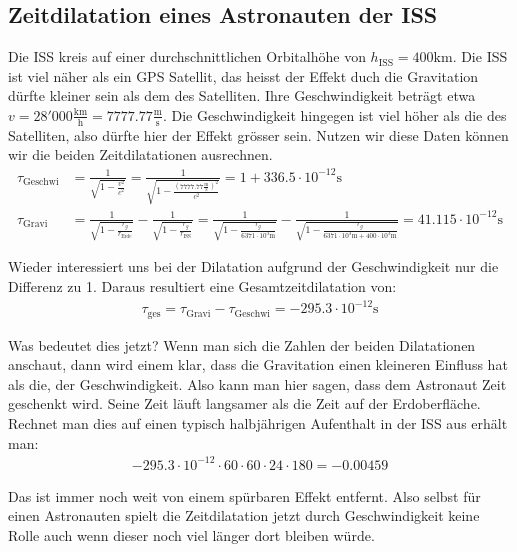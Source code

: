 \begin{refsection}
\subsection{Zeitdilatation eines Astronauten der ISS}
Die ISS kreis auf einer durchschnittlichen Orbitalhöhe von \( h_{\text{ISS}} = 400\text{km} \). Die ISS ist viel näher als ein GPS Satellit, das heisst der Effekt duch die Gravitation dürfte kleiner sein als dem des Satelliten. Ihre Geschwindigkeit beträgt etwa \( v = 28'000\frac{\text{km}}{\text{h}} = 7777.77\frac{\text{m}}{\text{s}} \). Die Geschwindigkeit hingegen ist viel höher als die des Satelliten, also dürfte hier der Effekt grösser sein. Nutzen wir diese Daten können wir die beiden Zeitdilatationen ausrechnen.
\begin{align*}
\tau_{\text{Geschwi}} &= \frac{1}{\sqrt{1 - \frac{v^2}{c^2}}} = \frac{1}{\sqrt{1 - \frac{( 7777.77\frac{\text{m}}{\text{s}})^2}{c^2}}} = 1 + 336.5 \cdot 10^{-12}\text{s}
\\
\tau_{\text{Gravi}} &= \frac{1}{\sqrt{1-\frac{r_g}{r_{\text{Erde}}}}} - \frac{1}{\sqrt{1-\frac{r_g}{r_{\text{ISS}}}}} 
= \frac{1}{\sqrt{1-\frac{r_g}{6371 \cdot 10^3\text{m}}}} - \frac{1}{\sqrt{1-\frac{r_g}{6371 \cdot 10^3\text{m} + 400 \cdot 10^3\text{m}}}} = 41.115 \cdot 10^{-12}\text{s}
\end{align*}

\noindent{}Wieder interessiert uns bei der Dilatation aufgrund der Geschwindigkeit nur die Differenz zu 1. Daraus resultiert eine Gesamtzeitdilatation von:
\begin{align*}
\tau_{\text{ges}} = \tau_{\text{Gravi}} - \tau_{\text{Geschwi}} = -295.3 \cdot 10^{-12}\text{s}
\end{align*}

\noindent{}Was bedeutet dies jetzt? Wenn man sich die Zahlen der beiden Dilatationen anschaut, dann wird einem klar, dass die Gravitation einen kleineren Einfluss hat als die, der Geschwindigkeit. Also kann man hier sagen, dass dem Astronaut Zeit geschenkt wird. Seine Zeit läuft langsamer als die Zeit auf der Erdoberfläche. Rechnet man dies auf einen typisch halbjährigen Aufenthalt in der ISS aus erhält man:
\begin{align*}
-295.3 \cdot 10^{-12} \cdot 60 \cdot 60 \cdot 24 \cdot 180 = -0.00459
\end{align*}

\noindent{}Das ist immer noch weit von einem spürbaren Effekt entfernt. Also selbst für einen Astronauten spielt die Zeitdilatation jetzt durch Geschwindigkeit keine Rolle auch wenn dieser noch viel länger dort bleiben würde.


\end{refsection}
